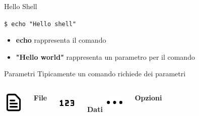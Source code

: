 \documentclass{beamer}
\begin{document}
    \begin{frame}{Hello Shell}
        \begin{exampleblock}{}
            \texttt{\$ echo "Hello shell"}
        \end{exampleblock}

        \begin{itemize}
            \item \textbf{echo} rappresenta il comando
            \item \textbf{"Hello world"} rappresenta un parametro per il comando
        \end{itemize}

        \begin{block}{Parametri}
            Tipicamente un comando richiede dei parametri
            
            \vspace{0.5cm}

            \begin{columns}[t, onlytextwidth]
                    \centering
                    \includegraphics[height=1cm, keepaspectratio]{images/file.pdf}
                    
                    \textbf{File}
    
                    \centering
                    \includegraphics[height=1cm, keepaspectratio]{images/input-data.pdf}
                    
                    \textbf{Dati}
                    \centering
                    \includegraphics[height=1cm, keepaspectratio]{images/options.pdf}
                    
                    \textbf{Opzioni}
            \end{columns}

            \vspace{0.5cm}
        \end{block}
    \end{frame}
\end{document}
